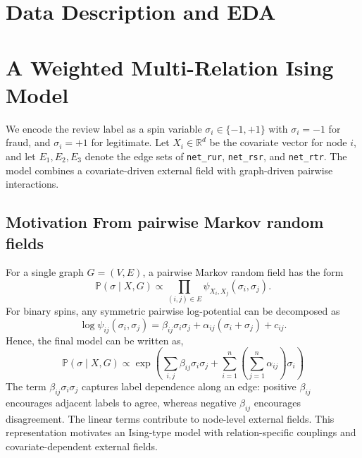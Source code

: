 \documentclass[twoside]{article}
\newcommand{\Pbb}{\mathbb P}
\newcommand{\R}{\mathbb R}
\newcommand{\netrur}{\texttt{net\_rur}}
\newcommand{\netrsr}{\texttt{net\_rsr}}
\newcommand{\netrtr}{\texttt{net\_rtr}}
\begin{document}
\section{Data Description and EDA}

\section{A Weighted Multi-Relation Ising Model}

We encode the review label as a spin variable $\sigma_i\in\{-1,+1\}$ with $\sigma_i=-1$ for fraud, and $\sigma_i=+1$  for legitimate.
Let $X_i\in\R^d$ be the covariate vector for node $i$, and let $E_1,E_2,E_3$ denote the edge sets of \netrur, \netrsr, and \netrtr. The model combines a covariate-driven external field with graph-driven pairwise interactions.

\subsection{Motivation From pairwise Markov random fields}

For a single graph $G=(V,E)$, a pairwise Markov random field has the form
\[
    \Pbb(\sigma\mid X,G) \propto \prod_{(i,j)\in E} \psi_{X_i,X_j}(\sigma_i,\sigma_j).
\]
For binary spins, any symmetric pairwise log-potential can be decomposed as
\[
    \log \psi_{ij}(\sigma_i,\sigma_j)
    = \beta_{ij}\sigma_i\sigma_j + \alpha_{ij}(\sigma_i+\sigma_j)+c_{ij}.
\]
Hence, the final model can be written as,
\begin{equation*}
    \Pbb(\sigma\mid X,G) \propto \exp\left(\sum_{i,j}\beta_{ij}\sigma_i\sigma_j + \sum_{i=1}^n\left(\sum_{j=1}^n\alpha_{ij}\right)\sigma_i\right)
\end{equation*}
The term $\beta_{ij}\sigma_i\sigma_j$ captures label dependence along an edge: positive $\beta_{ij}$ encourages adjacent labels to agree, whereas negative $\beta_{ij}$ encourages disagreement. The linear terms contribute to node-level external fields. This representation motivates an Ising-type model with relation-specific couplings and covariate-dependent external fields.
\end{document}
